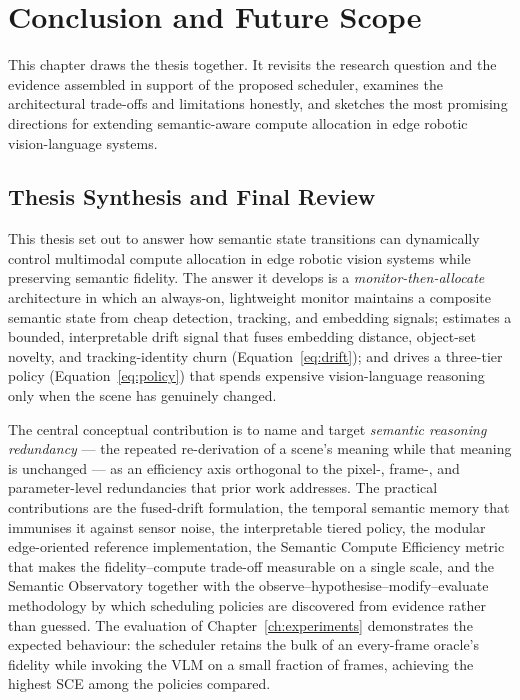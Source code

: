 \chapter{Conclusion and Future Scope}
\label{ch:conclusion}

\begin{chapterabstract}
This chapter draws the thesis together. It revisits the research question and
the evidence assembled in support of the proposed scheduler, examines the
architectural trade-offs and limitations honestly, and sketches the most
promising directions for extending semantic-aware compute allocation in edge
robotic vision-language systems.
\end{chapterabstract}

\section{Thesis Synthesis and Final Review}
\label{sec:concl-synthesis}

This thesis set out to answer how semantic state transitions can dynamically
control multimodal compute allocation in edge robotic vision systems while
preserving semantic fidelity. The answer it develops is a
\emph{monitor-then-allocate} architecture in which an always-on, lightweight
monitor maintains a composite semantic state from cheap detection, tracking,
and embedding signals; estimates a bounded, interpretable drift signal that
fuses embedding distance, object-set novelty, and tracking-identity churn
(Equation~\ref{eq:drift}); and drives a three-tier policy
(Equation~\ref{eq:policy}) that spends expensive vision-language reasoning
only when the scene has genuinely changed.

The central conceptual contribution is to name and target \emph{semantic
reasoning redundancy} --- the repeated re-derivation of a scene's meaning while
that meaning is unchanged --- as an efficiency axis orthogonal to the pixel-,
frame-, and parameter-level redundancies that prior work addresses. The
practical contributions are the fused-drift formulation, the temporal
semantic memory that immunises it against sensor noise, the interpretable
tiered policy, the modular edge-oriented reference implementation, the
Semantic Compute Efficiency metric that makes the fidelity--compute trade-off
measurable on a single scale, and the Semantic Observatory together with the
observe--hypothesise--modify--evaluate methodology by which scheduling policies
are discovered from evidence rather than guessed. The evaluation of
Chapter~\ref{ch:experiments} demonstrates the expected behaviour: the
scheduler retains the bulk of an every-frame oracle's fidelity while invoking
the VLM on a small fraction of frames, achieving the highest SCE among the
policies compared.

